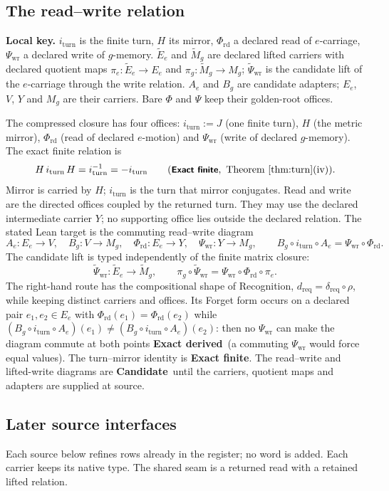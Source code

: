 \documentclass[11pt,a4paper]{article}
\newcommand{\iturn}{i_{\mathrm{turn}}}\newcommand{\gJ}{g_J}\newcommand{\gG}{g_G}
\newcommand{\Phird}{\Phi_{\mathrm{rd}}}\newcommand{\Psiwr}{\Psi_{\mathrm{wr}}}
\newcommand{\st}[1]{\textsf{\small\textbf{#1}}}
\newcommand{\Sfin}{\st{Exact finite}}\newcommand{\Sder}{\st{Exact derived}}
\newcommand{\Scand}{\st{Candidate}}
\newcommand{\lkey}[1]{\par\noindent\textbf{Local key.} #1\par\smallskip}
\theoremstyle{plain}
\theoremstyle{definition}
\theoremstyle{remark}
\begin{document}
\subsection{The read--write relation}\label{sec:rw}
\lkey{$\iturn$ is the finite turn, $H$ its mirror, $\Phird$ a declared read of $e$-carriage, $\Psiwr$ a declared write of $g$-memory. $\tilde E_e$ and $\tilde M_g$ are declared lifted carriers with declared quotient maps $\pi_e:\tilde E_e\to E_e$ and $\pi_g:\tilde M_g\to M_g$; $\tilde\Psi_{\mathrm{wr}}$ is the candidate lift of the $e$-carriage through the write relation. $A_e$ and $B_g$ are candidate adapters; $E_e$, $V$, $Y$ and $M_g$ are their carriers. Bare $\Phi$ and $\Psi$ keep their golden-root offices.}
The compressed closure has four offices: $\iturn:=J$ (one finite turn), $H$ (the metric mirror), $\Phird$ (read of declared $e$-motion) and $\Psiwr$ (write of declared $g$-memory). The exact finite relation is
\[
H\,\iturn\,H=\iturn^{-1}=-\iturn\qquad(\Sfin,\ \text{Theorem~\ref{thm:turn}(iv)}).
\]
Mirror is carried by $H$; $\iturn$ is the turn that mirror conjugates. Read and write are the directed offices coupled by the returned turn. They may use the declared intermediate carrier $Y$; no supporting office lies outside the declared relation. The stated Lean target is the commuting read--write diagram
\[
A_e:E_e\to V,\quad B_g:V\to M_g,\quad \Phird:E_e\to Y,\quad \Psiwr:Y\to M_g,\qquad B_g\circ\iturn\circ A_e=\Psiwr\circ\Phird .
\]
The candidate lift is typed independently of the finite matrix closure:
\[
\tilde\Psi_{\mathrm{wr}}:\tilde E_e\longrightarrow\tilde M_g,\qquad \pi_g\circ\tilde\Psi_{\mathrm{wr}}=\Psiwr\circ\Phird\circ\pi_e .
\]
The right-hand route has the compositional shape of Recognition, $d_{\mathrm{req}}=\delta_{\mathrm{req}}\circ\rho$, while keeping distinct carriers and offices. Its Forget form occurs on a declared pair $e_1,e_2\in E_e$ with $\Phird(e_1)=\Phird(e_2)$ while $(B_g\circ\iturn\circ A_e)(e_1)\ne(B_g\circ\iturn\circ A_e)(e_2)$: then no $\Psiwr$ can make the diagram commute at both points \Sder\ (a commuting $\Psiwr$ would force equal values). The turn--mirror identity is \Sfin. The read--write and lifted-write diagrams are \Scand\ until the carriers, quotient maps and adapters are supplied at source.

\subsection{Later source interfaces}
Each source below refines rows already in the register; no word is added. Each carrier keeps its native type. The shared seam is a returned read with a retained lifted relation.
\end{document}
